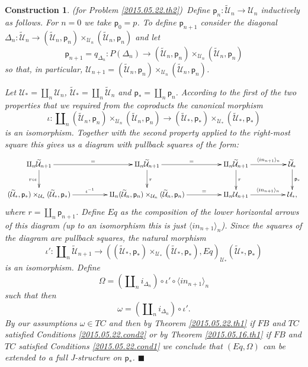 \documentclass[12pt]{article}
\numberwithin{equation}{section}
\newtheorem{construction0}[proposition]{Construction}
\newenvironment{construction}[1]{\begin{construction0}(for Problem \ref{#1})\ }{$\blacksquare$ \end{construction0}}
\newcommand{\sr}{\rightarrow}
\newcommand{\wt}{\widetilde}
\newcommand{\p}{\mathsf{p}}
\newcommand{\U}{\mathcal{U}}
\begin{document}
\begin{construction}{2015.05.22.th2}\rm\label{2015.05.23.constr1}
Define $\p_n:\wt{\U}_n\sr \U_n$ inductively as follows. For $n=0$ we take
$\p_0=p$. To define $\p_{n+1}$ consider the diagonal $\Delta_n:\wt{\U}_n\sr
(\wt{\U}_n,\p_n)\times_{\U_n}(\wt{\U}_n,\p_n)$ and let
%
$$\p_{n+1}=q_{\Delta_n}:P(\Delta_n)\sr
(\wt{\U}_n,\p_n)\times_{\U_n}(\wt{\U}_n,\p_n)$$
%
so that, in particular, $\U_{n+1}=(\wt{\U}_n,\p_n)\times_{\U_n}(\wt{\U}_n,\p_n)$.

Let $\U_*=\amalg_n \U_n$, $\wt{\U}_*=\amalg_n\wt{\U}_n$ and $\p_*=\amalg_n
\p_n$. According to the first of the two properties that we required from the
coproducts the canonical morphism
%
$$\iota:\amalg_n (\wt{\U}_n,\p_n)\times_{\U_n}(\wt{\U}_n,\p_n)\sr
(\wt{\U}_*,\p_*)\times_{\U_*}(\wt{\U}_*,\p_*)$$
%
is an isomorphism. Together with the second property applied to the right-most
square this gives us a diagram with pullback squares of the form:
%
$$
\begin{xy}
          \xymatrix@C=4pc{
                 \amalg_n\wt{\U}_{n+1}  \ar[r]^-{=} \ar[d]_{r\circ \iota} & 
                 \amalg_n\wt{\U}_{n+1} \ar[r]^-{=} \ar[d]^{r} &
		 \amalg_n\wt{\U}_{n+1} \ar[r]^-{\langle in_{n+1} \rangle_{n}} \ar[d]^{r} &
		\wt{\U}_* \ar[d]^{\p_*} \\
		(\wt{\U}_*,\p_*)\times_{\U_*}(\wt{\U}_*,\p_*) \ar[r]^-{\iota^{-1}} &
		\amalg_n (\wt{\U}_n,\p_n)\times_{\U_n}(\wt{\U}_n,\p_n) \ar[r]^-{=} &
		\amalg_n \U_{n+1} \ar[r]^-{\langle in_{n+1} \rangle_{n}} &
		\U_*,
                }
\end{xy}
$$
%
where  $r=\amalg_n  \p_{n+1}$. Define  $Eq$  as  the  composition of  the  lower
horizontal arrows of  this diagram (up to an isomorphism  this is just $\langle
in_{n+1}\rangle_{n}$).  Since the squares of the diagram are pullback squares, the
natural morphism
%
\[\iota':\amalg_n\wt{\U}_{n+1}\sr
((\wt{\U}_*,\p_*)\times_{\U_*}(\wt{\U}_*,\p_*),Eq)_{\U_*} (\wt{\U}_*,\p_*)\]
%
is an isomorphism. Define
%
\[\Omega=(\amalg_n    i_{\Delta_n})\circ     \iota'\circ    \langle    in_{n+1}
\rangle_{n}\]
%
such that then
%
\[\omega=(\amalg_n i_{\Delta_n})\circ \iota'.\]
%
By our assumptions  $\omega\in TC$ and then by  Theorem \ref{2015.05.22.th1} if
$FB$  and  $TC$  satisfied  Conditions  \ref{2015.05.22.cond2}  or  by  Theorem
\ref{2015.05.16.th1}     if    $FB$     and    $TC$     satisfied    Conditions
\ref{2015.05.22.cond1} we conclude that $(Eq,\Omega)$ can be extended to a full
J-structure on $\p_*$.
\end{construction}
%
\end{document}
